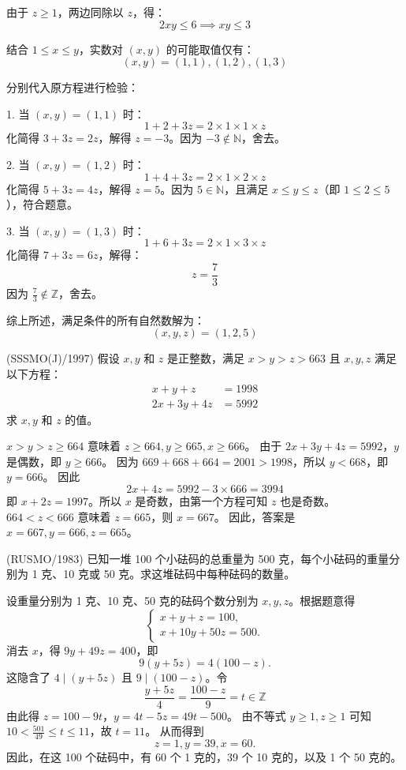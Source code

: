 \begin{questions}
\begin{solution}
由于 $z \ge 1$，两边同除以 $z$，得：
\[
2xy \le 6 \implies xy \le 3
\]

结合 $1 \le x \le y$，实数对 $(x, y)$ 的可能取值仅有：
\[
(x, y) = (1, 1), (1, 2), (1, 3)
\]

分别代入原方程进行检验：

1. 当 $(x, y) = (1, 1)$ 时：
\[
1 + 2 + 3z = 2 \times 1 \times 1 \times z
\]
化简得 $3 + 3z = 2z$，解得 $z = -3$。因为 $-3 \notin \mathbb{N}$，舍去。

2. 当 $(x, y) = (1, 2)$ 时：
\[
1 + 4 + 3z = 2 \times 1 \times 2 \times z
\]
化简得 $5 + 3z = 4z$，解得 $z = 5$。因为 $5 \in \mathbb{N}$，且满足 $x \le y \le z$（即 $1 \le 2 \le 5$），符合题意。

3. 当 $(x, y) = (1, 3)$ 时：
\[
1 + 6 + 3z = 2 \times 1 \times 3 \times z
\]
化简得 $7 + 3z = 6z$，解得：
\[
z = \frac{7}{3}
\]
因为 $\frac{7}{3} \notin \mathbb{Z}$，舍去。

综上所述，满足条件的所有自然数解为：
\[
(x, y, z) = (1, 2, 5)
\]
\end{solution}

\question (SSSMO(J)/1997) 假设 $x, y$ 和 $z$ 是正整数，满足 $x > y > z > 663$ 且 $x, y, z$ 满足以下方程：
\begin{align*}
x + y + z &= 1998 \\
2x + 3y + 4z &= 5992
\end{align*}
求 $x, y$ 和 $z$ 的值。

\begin{solution}
$x > y > z \ge 664$ 意味着 $z \ge 664, y \ge 665, x \ge 666$。
由于 $2x + 3y + 4z = 5992$，$y$ 是偶数，即 $y \ge 666$。
因为 $669 + 668 + 664 = 2001 > 1998$，所以 $y < 668$，即 $y = 666$。
因此
\[
2x + 4z = 5992 - 3 \times 666 = 3994
\]
即 $x + 2z = 1997$。所以 $x$ 是奇数，由第一个方程可知 $z$ 也是奇数。
$664 < z < 666$ 意味着 $z = 665$，则 $x = 667$。
因此，答案是 $x = 667, y = 666, z = 665$。
\end{solution}

\question (RUSMO/1983) 已知一堆 100 个小砝码的总重量为 500 克，每个小砝码的重量分别为 1 克、10 克或 50 克。求这堆砝码中每种砝码的数量。

\begin{solution}
设重量分别为 1 克、10 克、50 克的砝码个数分别为 $x, y, z$。根据题意得
\[
\begin{cases}
x + y + z = 100, \\
x + 10y + 50z = 500.
\end{cases}
\]
消去 $x$，得 $9y + 49z = 400$，即
\[
9(y + 5z) = 4(100 - z).
\]
这隐含了 $4 \mid (y + 5z)$ 且 $9 \mid (100 - z)$。令
\[
\frac{y + 5z}{4} = \frac{100 - z}{9} = t \in \mathbb{Z}
\]
由此得 $z = 100 - 9t$，$y = 4t - 5z = 49t - 500$。
由不等式 $y \ge 1, z \ge 1$ 可知 $10 < \frac{501}{49} \le t \le 11$，故 $t = 11$。
从而得到
\[
z = 1, y = 39, x = 60.
\]
因此，在这 100 个砝码中，有 60 个 1 克的，39 个 10 克的，以及 1 个 50 克的。
\end{solution}


\end{questions}
